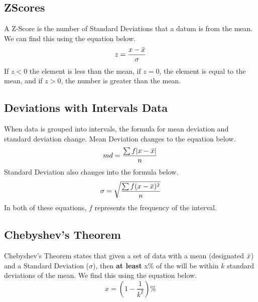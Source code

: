     \subsection{Z\textemdash Scores}
    A Z-Score is the number of Standard Deviations that a datum is from the mean. We can find this using the equation below. 
    \begin{equation*}
        z = \frac{x-\bar{x}}{\sigma}
    \end{equation*}
    If $z<0$ the element is less than the mean, if $z=0$, the element is equal to the mean, and if $z>0$, the number is greater than the mean.
    
    \subsection{Deviations with Intervals Data}
    When data is grouped into intervals, the formula for mean deviation and standard deviation change. Mean Deviation changes to the equation below.
    \begin{equation*}
        md = \frac{\sum f|x-\bar{x}|}{n}
    \end{equation*}
    Standard Deviation also changes into the formula below.
    \begin{equation*}
        \sigma = \sqrt{\frac{\sum f(x-\bar{x})^2}{n}}
    \end{equation*}
    In both of these equations, $f$ represents the frequency of the interval. 
    
    \subsection{Chebyshev's Theorem}
    Chebyshev's Theorem states that given a set of data with a mean (designated $\bar{x}$) and a Standard Deviation ($\sigma$), then \textbf{at least} x\% of the will be within $k$ standard deviations of the mean. We find this using the equation below.
    \begin{equation*}
        x = (1-\frac{1}{k^2})\%
    \end{equation*}
    
